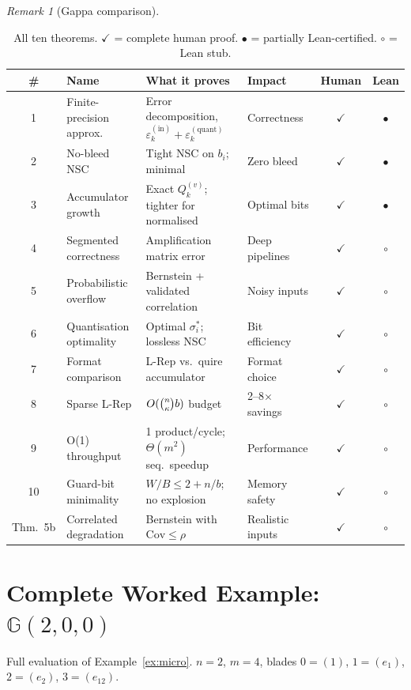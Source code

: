 \documentclass[11pt,a4paper]{article}
\theoremstyle{definition}
\theoremstyle{plain}
\theoremstyle{remark}
\newtheorem{remark}{Remark}[section]
\newcommand{\GA}{\mathbb{G}}
\newcommand{\Cov}{\mathrm{Cov}}
\begin{document}
\begin{remark}[Gappa comparison]
\begin{table}[h]
\centering
\caption{All ten theorems. $\checkmark$ = complete human proof.
$\bullet$ = partially Lean-certified. $\circ$ = Lean stub.}
\label{tab:all-thms}
\small
\begin{tabular}{clp{4cm}p{2.8cm}cc}
\toprule
\# & Name & What it proves & Impact & Human & Lean \\
\midrule
1 & Finite-precision approx. & Error decomposition, $\varepsilon_k^{(\mathrm{in})}+\varepsilon_k^{(\mathrm{quant})}$ & Correctness & $\checkmark$ & $\bullet$ \\
2 & No-bleed NSC & Tight NSC on $b_i$; minimal & Zero bleed & $\checkmark$ & $\bullet$ \\
3 & Accumulator growth & Exact $Q_k^{(v)}$; tighter for normalised & Optimal bits & $\checkmark$ & $\bullet$ \\
4 & Segmented correctness & Amplification matrix error & Deep pipelines & $\checkmark$ & $\circ$ \\
5 & Probabilistic overflow & Bernstein + validated correlation & Noisy inputs & $\checkmark$ & $\circ$ \\
6 & Quantisation optimality & Optimal $\sigma_i^*$; lossless NSC & Bit efficiency & $\checkmark$ & $\circ$ \\
7 & Format comparison & L-Rep vs.\ quire accumulator & Format choice & $\checkmark$ & $\circ$ \\
8 & Sparse L-Rep & $O(\tbinom{n}{\kappa}b)$ budget & 2--8$\times$ savings & $\checkmark$ & $\circ$ \\
9 & O(1) throughput & 1 product/cycle; $\Theta(m^2)$ seq.\ speedup & Performance & $\checkmark$ & $\circ$ \\
10 & Guard-bit minimality & $W/B\le2+n/b$; no explosion & Memory safety & $\checkmark$ & $\circ$ \\
\midrule
Thm.~5b & Correlated degradation & Bernstein with $\Cov\le\rho$ & Realistic inputs & $\checkmark$ & $\circ$ \\
\bottomrule
\end{tabular}
\end{table}

\section{Complete Worked Example: $\GA(2,0,0)$}
\label{app:micro}

Full evaluation of Example~\ref{ex:micro}.
$n=2$, $m=4$, blades $0=(1)$, $1=(e_1)$, $2=(e_2)$, $3=(e_{12})$.


\end{remark}
\end{document}
